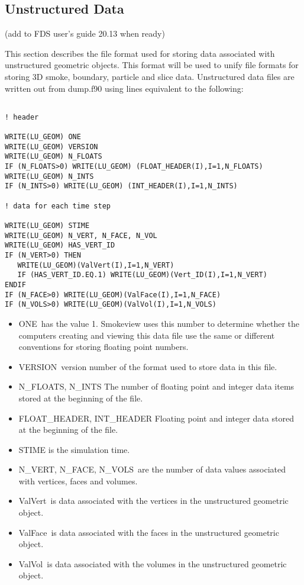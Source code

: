 \documentclass[12pt]{article}
\begin{document}
\subsection{Unstructured Data}

\label{out:GEOMETRYDATA}

(add to FDS user's guide 20.13 when ready)

This section describes the file format used for
storing data associated with unstructured geometric objects.  This format will be used to unify file formats for storing 3D smoke, boundary, particle and slice data.
Unstructured data files are written out from {\ct dump.f90} using lines equivalent to the following:

\begin{lstlisting}

! header

WRITE(LU_GEOM) ONE
WRITE(LU_GEOM) VERSION
WRITE(LU_GEOM) N_FLOATS
IF (N_FLOATS>0) WRITE(LU_GEOM) (FLOAT_HEADER(I),I=1,N_FLOATS)
WRITE(LU_GEOM) N_INTS
IF (N_INTS>0) WRITE(LU_GEOM) (INT_HEADER(I),I=1,N_INTS)

! data for each time step

WRITE(LU_GEOM) STIME
WRITE(LU_GEOM) N_VERT, N_FACE, N_VOL
WRITE(LU_GEOM) HAS_VERT_ID
IF (N_VERT>0) THEN
   WRITE(LU_GEOM)(ValVert(I),I=1,N_VERT)
   IF (HAS_VERT_ID.EQ.1) WRITE(LU_GEOM)(Vert_ID(I),I=1,N_VERT)
ENDIF
IF (N_FACE>0) WRITE(LU_GEOM)(ValFace(I),I=1,N_FACE)
IF (N_VOLS>0) WRITE(LU_GEOM)(ValVol(I),I=1,N_VOLS)

\end{lstlisting}

\begin{itemize}
\item {\ct ONE}\ has the value 1. Smokeview uses this number to determine whether the computers creating and viewing this data file use the same or different conventions for storing floating point numbers.
\item {\ct VERSION}\ version number of the format used to store data in this file.
\item {\ct N\_FLOATS, N\_INTS} The number of floating point and integer data items stored at the beginning of the file.
\item {\ct FLOAT\_HEADER, INT\_HEADER} Floating point and integer data stored at the beginning of the file.
\item {\ct STIME} is the simulation time.
\item {\ct N\_VERT, N\_FACE, N\_VOLS}\ are the number of data values associated with vertices, faces and volumes.
\item {\ct ValVert}\ is data associated with the vertices in the unstructured geometric object.
\item {\ct ValFace}\ is data associated with the faces in the unstructured geometric object.
\item {\ct ValVol}\ is data associated with the volumes in the unstructured geometric object.
\end{itemize}
\end{document}
